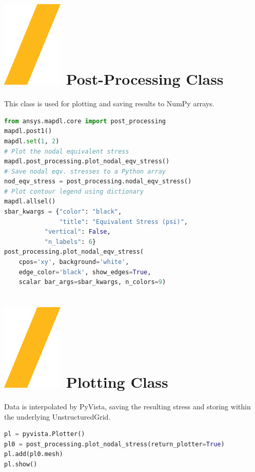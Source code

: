\documentclass[9pt,landscape]{article}
\begin{document}
\begin{multicols}{3}
\section{\includegraphics[height=\fontcharht\font`\S]{slash.png} Post-Processing Class}
This class is used for plotting and saving results to NumPy arrays.
\begin{lstlisting}[language=Python]
from ansys.mapdl.core import post_processing
mapdl.post1()
mapdl.set(1, 2)
# Plot the nodal equivalent stress
mapdl.post_processing.plot_nodal_eqv_stress()
# Save nodal eqv. stresses to a Python array
nod_eqv_stress = post_processing.nodal_eqv_stress()
# Plot contour legend using dictionary
mapdl.allsel()
sbar_kwargs = {"color": "black",
               "title": "Equivalent Stress (psi)",
	       "vertical": False,
	       "n_labels": 6}
post_processing.plot_nodal_eqv_stress(
    cpos='xy', background='white',
    edge_color='black', show_edges=True,
    scalar bar_args=sbar_kwargs, n_colors=9)
\end{lstlisting} 
\vfill

\section{\includegraphics[height=\fontcharht\font`\S]{slash.png} Plotting Class}
Data is interpolated by PyVista, saving the resulting stress and storing within the underlying UnstructuredGrid.
\begin{lstlisting}[language=Python]
pl = pyvista.Plotter()
pl0 = post_processing.plot_nodal_stress(return_plotter=True)
pl.add(pl0.mesh)
pl.show()
\end{lstlisting} 


\end{multicols}
\end{document}
